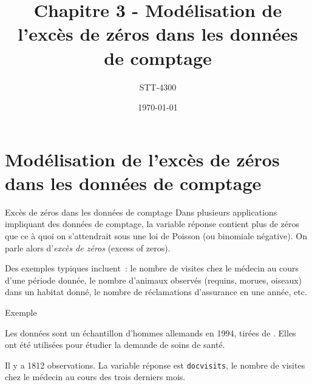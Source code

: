 \documentclass{BeamerTemplate}
\title{Chapitre 3 - Modélisation de l'excès de zéros dans les données de comptage}
\subtitle{STT-4300}
\date{\today}
\begin{document}
\begin{refsection}

\begin{frame}[t]
\titlepage
\end{frame}

\section{Modélisation de l'excès de zéros dans les données de comptage}

\begin{frame}{Excès de zéros dans les données de comptage}
Dans plusieurs applications impliquant des données de comptage, la variable réponse contient plus de zéros que ce à quoi on s'attendrait sous une loi de Poisson (ou binomiale négative). On parle alors d'\textit{excès de zéros} (excess of zeros).

\bigskip 
\bigskip 

Des exemples typiques incluent~: le nombre de visites chez le médecin au cours d'une période donnée, le nombre d'animaux observés (requins, morues, oiseaux) dans un habitat donné, le nombre de réclamations d'assurance en une année, etc.
\end{frame}

\begin{frame}{Exemple}

Les données sont un échantillon d'hommes allemands en 1994, tirées de
. Elles ont été utilisées pour étudier la demande de soins de santé. 

\bigskip
Il y a 1812 observations. La variable réponse est \texttt{docvisits}, le nombre de
visites chez le médecin au cours des trois derniers mois.
\end{frame}


\end{refsection}
\end{document}
